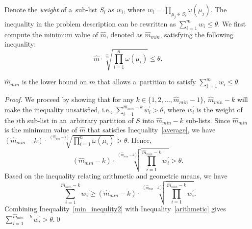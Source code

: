 \documentclass[runningheads,a4paper]{llncs}
\begin{document}
Denote the \emph{weight} of a~sub-list $S_i$ as $w_i$, where $w_i=\prod_{\mu_j \in S_i} \omega(\mu_j).$
The inequality in the problem description can be rewritten as $\sum_{i=1}^{m}w_i \leq \theta$.
We first compute the minimum value of $\hat{m}$, denoted as $\hat{m}_{min}$, satisfying the
following inequality:
%
\begin{equation}
\label{average}
\hat{m}\cdot \sqrt[\hat{m}]{\prod_{i=1}^{n}\omega(\mu_i)} \leq \theta.
\end{equation}
%
\begin{theorem}
\label{theo:min_inequlity}
$\hat{m}_{min}$ is the lower bound on $m$ that allows a~partition to satisfy $\sum_{i=1}^{m}w_i
\leq \theta$.
\end{theorem}
%
\begin{proof}
We proceed by showing that for any $k \in \{1,2,\ldots,\hat{m}_{min}-1\}$, $\hat{m}_{min}-k$ will
make the inequality unsatisfied, i.e., $\sum_{i=1}^{\hat{m}_{min}-k}w_i^{'} > \theta$,
%
%
where $w_{i}^{'}$ is the weight of the $i$th sub-list
in an~arbitrary partition of $S$ into $\hat{m}_{min}-k$ sub-lists.
Since $\hat{m}_{min}$ is the minimum value of $\hat{m}$ that satisfies Inequality~\eqref{average},
we have $(\hat{m}_{min}-k)\cdot \sqrt[(\hat{m}_{min}-k)]{\prod_{i=1}^{n}\omega(\mu_i)} > \theta$.
Hence,
\begin{equation}
\label{min_inequlity2}
(\hat{m}_{min}-k)\cdot \sqrt[(\hat{m}_{min}-k)]{\prod_{i=1}^{\hat{m}_{min}-k}w_i^{'}} > \theta.
\end{equation}
Based on the inequality relating arithmetic and geometric means, %
we have
\begin{equation}
\label{arithmetic}
\sum_{i=1}^{\hat{m}_{min}-k}w_i^{'} \geq (\hat{m}_{min}-k)\cdot \sqrt[(\hat{m}_{min}-k)]{\prod_{i=1}^{\hat{m}_{min}-k}w_i^{'}}.
\end{equation}
Combining Inequality~\eqref{min_inequlity2} with Inequality~\eqref{arithmetic} gives
$\sum_{i=1}^{\hat{m}_{min}-k}w_i^{'} > \theta$.\qed
\end{proof}

\end{document}
